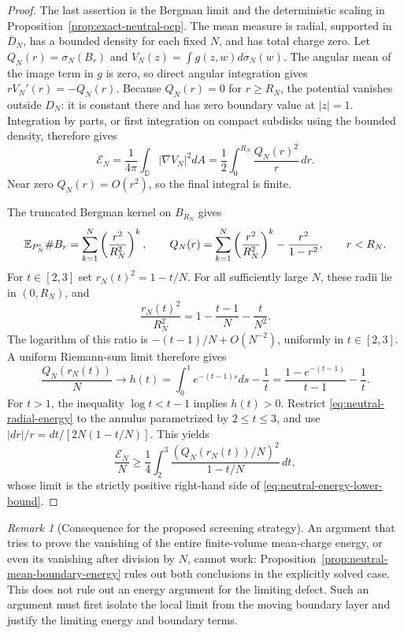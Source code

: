 \documentclass[11pt,a4paper]{article}
\numberwithin{equation}{section}
\theoremstyle{definition}
\theoremstyle{remark}
\newtheorem{remark}[theorem]{Remark}
\begin{document}
\begin{proof}
The last assertion is the Bergman limit and the deterministic scaling
in Proposition~\ref{prop:exact-neutral-ocp}.
The mean measure is radial, supported in $\overline D_N$, has a bounded
density for each fixed $N$, and has total charge zero.
Let $Q_N(r)=\sigma_N(B_r)$ and
$V_N(z)=\int g(z,w)d\sigma_N(w)$.
The angular mean of the image term in $g$ is zero, so direct angular
integration gives
$rV_N'(r)=-Q_N(r)$.
Because $Q_N(r)=0$ for $r\ge R_N$, the potential vanishes outside
$D_N$: it is constant there and has zero boundary value at $|z|=1$.
Integration by parts, or first integration on compact subdisks using
the bounded density, therefore gives
\begin{equation}
 \mathcal E_N
 =\frac1{4\pi}\int_{\mathbb D}|\nabla V_N|^2dA
 =\frac12\int_0^{R_N}\frac{Q_N(r)^2}{r}\,dr.
 \label{eq:neutral-radial-energy}
\end{equation}
Near zero $Q_N(r)=O(r^2)$, so the final integral is finite.

The truncated Bergman kernel on $B_{R_N}$ gives
\[
 \mathbb E_{P_N^{\rm s}}\#B_r
 =\sum_{k=1}^N\left(\frac{r^2}{R_N^2}\right)^k,
 \qquad
 Q_N(r)=\sum_{k=1}^N\left(\frac{r^2}{R_N^2}\right)^k
                  -\frac{r^2}{1-r^2},\qquad r<R_N.
\]
For $t\in[2,3]$ set $r_N(t)^2=1-t/N$.  For all sufficiently large
$N$, these radii lie in $(0,R_N)$, and
\[
 \frac{r_N(t)^2}{R_N^2}
 =1-\frac{t-1}{N}-\frac{t}{N^2}.
\]
The logarithm of this ratio is $-(t-1)/N+O(N^{-2})$, uniformly in
$t\in[2,3]$.  A uniform Riemann-sum limit therefore gives
\[
 \frac{Q_N(r_N(t))}{N}\longrightarrow
 h(t)=\int_0^1e^{-(t-1)s}ds-\frac1t
     =\frac{1-e^{-(t-1)}}{t-1}-\frac1t.
\]
For $t>1$, the inequality $\log t<t-1$ implies $h(t)>0$.
Restrict \eqref{eq:neutral-radial-energy} to the annulus parametrized
by $2\le t\le3$, and use
$|dr|/r=dt/[2N(1-t/N)]$.  This yields
\[
 \frac{\mathcal E_N}{N}
 \ge\frac14\int_2^3
 \frac{(Q_N(r_N(t))/N)^2}{1-t/N}\,dt,
\]
whose limit is the strictly positive right-hand side of
\eqref{eq:neutral-energy-lower-bound}.
\end{proof}

\begin{remark}[Consequence for the proposed screening strategy]
An argument that tries to prove the vanishing of the entire
finite-volume mean-charge energy, or even its vanishing after division
by $N$, cannot work: Proposition~\ref{prop:neutral-mean-boundary-energy}
rules out both conclusions in the explicitly solved case.
This does not rule out an energy argument for the limiting defect.
Such an argument must first isolate the local limit from the moving
boundary layer and justify the limiting energy and boundary terms.
\end{remark}
\end{document}

